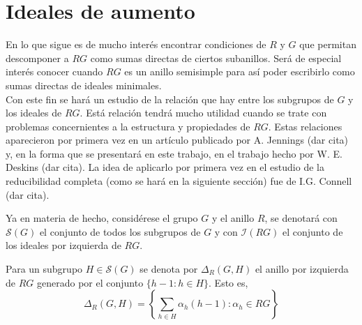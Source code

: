 \section{Ideales de aumento}

En lo que sigue es de mucho interés encontrar condiciones de $R$ y $G$ que permitan descomponer a $RG$ como sumas directas de ciertos subanillos. Será de especial interés conocer cuando $RG$ es un anillo semisimple para así poder escribirlo como sumas directas de ideales minimales. \\


Con este fin se hará un estudio de la relación que hay entre los subgrupos de $G$ y los ideales de $RG$. Está relación tendrá mucho utilidad cuando se trate con problemas concernientes a la estructura y propiedades de $RG$. Estas relaciones aparecieron por primera vez en un artículo publicado por A. Jennings (dar cita) y, en la forma que se presentará en este trabajo, en el trabajo hecho por W. E. Deskins (dar cita). La idea de aplicarlo por primera vez en el estudio de la reducibilidad completa (como se hará en la siguiente sección) fue de I.G. Connell (dar cita).

Ya en materia de hecho, considérese el grupo $G$ y el anillo $R$, se denotará con $\mathcal{S}(G)$  el conjunto de todos los subgrupos de $G$ y con $\mathcal{I}(RG)$ el conjunto de los ideales por izquierda de $RG$.

\begin{definicion}
Para un subgrupo $H \in \mathcal{S}(G)$ se denota por $\Delta_{R}(G,H)$ el anillo por izquierda de $RG$ generado por el conjunto $\{h-1: h \in H \}$. Esto es, 
\begin{equation}
\Delta_{R}(G,H) = \left\{ \sum_{h \in H} \alpha_h(h-1) : \alpha_h \in RG \right\}
\end{equation}
\end{definicion}

